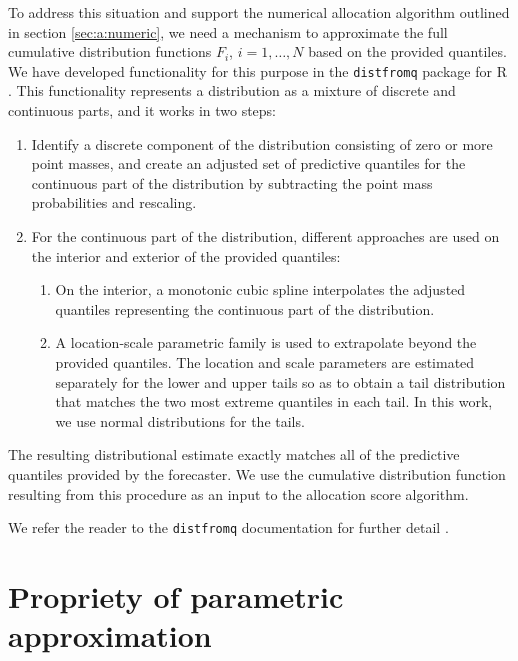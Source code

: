 \documentclass{article}\usepackage[]{graphicx}\usepackage[]{xcolor}
\begin{document}
To address this situation and support the numerical allocation algorithm outlined in section \ref{sec:a:numeric}, we need
a mechanism to approximate the full cumulative distribution functions $F_i$, $i = 1, \ldots, N$ based on the provided
quantiles. We have developed functionality for this purpose in the \verb`distfromq` package for R \citep{ray-distfromq}.
This functionality represents a distribution as a mixture of discrete and continuous parts, and it works in two steps:
\begin{enumerate}
  \item Identify a discrete component of the distribution consisting of zero or more point masses, and create an
    adjusted set of predictive quantiles for the continuous part of the distribution by subtracting the point mass
    probabilities and rescaling.
  \item For the continuous part of the distribution, different approaches are used on the interior and exterior of the
    provided quantiles:
  \begin{enumerate}
    \item On the interior, a monotonic cubic spline interpolates the adjusted quantiles representing the continuous part
      of the distribution.
    \item A location-scale parametric family is used to extrapolate beyond the provided quantiles. The location and
      scale parameters are estimated separately for the lower and upper tails so as to obtain a tail distribution that
      matches the two most extreme quantiles in each tail. In this work, we use normal distributions for the tails.
  \end{enumerate}
\end{enumerate}
The resulting distributional estimate exactly matches all of the predictive quantiles provided by the forecaster. We use
the cumulative distribution function resulting from this procedure as an input to the allocation score algorithm.

We refer the reader to the \verb`distfromq` documentation for further detail \citep{ray-distfromq}.

\section{Propriety of parametric approximation} %
\label{sec:a:propriety_of_parametric_approximation}
\end{document}
